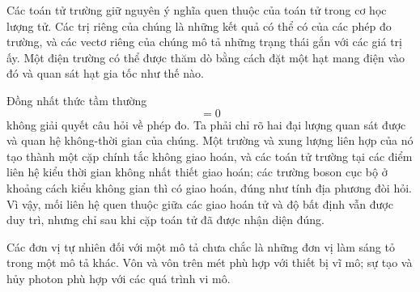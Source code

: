 Các toán tử trường giữ nguyên ý nghĩa quen thuộc của toán tử trong cơ học lượng tử. Các trị riêng của chúng là những kết quả có thể có của các phép đo trường, và các vectơ riêng của chúng mô tả những trạng thái gắn với các giá trị ấy. Một điện trường có thể được thăm dò bằng cách đặt một hạt mang điện vào đó và quan sát hạt gia tốc như thế nào.

\begin{classroomqa}
\end{classroomqa}

Đồng nhất thức tầm thường
\begin{equation}
[\phi(x),\phi(x)]=0
\end{equation}
không giải quyết câu hỏi về phép đo. Ta phải chỉ rõ hai đại lượng quan sát được và quan hệ không-thời gian của chúng. Một trường và xung lượng liên hợp của nó tạo thành một cặp chính tắc không giao hoán, và các toán tử trường tại các điểm liên hệ kiểu thời gian không nhất thiết giao hoán; các trường boson cục bộ ở khoảng cách kiểu không gian thì có giao hoán, đúng như tính địa phương đòi hỏi. Vì vậy, mối liên hệ quen thuộc giữa các giao hoán tử và độ bất định vẫn được duy trì, nhưng chỉ sau khi cặp toán tử đã được nhận diện đúng.

\begin{classroomqa}
\end{classroomqa}

Các đơn vị tự nhiên đối với một mô tả chưa chắc là những đơn vị làm sáng tỏ trong một mô tả khác. Vôn và vôn trên mét phù hợp với thiết bị vĩ mô; sự tạo và hủy photon phù hợp với các quá trình vi mô.

